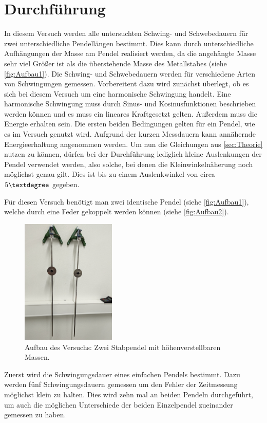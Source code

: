 \section{Durchführung}
\label{sec:Durchführung}
In diesem Versuch werden alle untersuchten Schwing- und Schwebedauern für zwei unterschiedliche Pendellängen bestimmt. Dies kann durch unterschiedliche Aufhängungen der Masse am 
Pendel realisiert werden, da die angehängte Masse sehr viel Größer ist als die überstehende Masse des Metallstabes (siehe \autoref{fig:Aufbau1}).
Die Schwing- und Schwebedauern werden für verschiedene Arten von Schwingungen gemessen. Vorbereitent dazu wird zunächst überlegt, ob es sich bei diesem Versuch um eine 
harmonische Schwingung handelt. Eine harmonische Schwingung muss durch  Sinus- und Kosinusfunktionen beschrieben werden können und es muss ein lineares Kraftgesetzt gelten.
Außerdem muss die Energie erhalten sein. Die ersten beiden Bedingungen gelten für ein Pendel, wie es im Versuch genutzt wird. Aufgrund der kurzen Messdauern kann annähernde 
Energieerhaltung angenommen werden. Um nun die Gleichungen aus \autoref{sec:Theorie} nutzen zu können, dürfen bei der Durchführung lediglich kleine Auslenkungen der Pendel 
verwendet werden, also solche, bei denen die Kleinwinkelnäherung noch möglichst genau gilt. Dies ist bis zu einem Auslenkwinkel von circa $5\textdegree$ gegeben. 


Für diesen Versuch benötigt man zwei identische Pendel (siehe \autoref{fig:Aufbau1}), welche durch eine Feder gekoppelt werden können (siehe \autoref{fig:Aufbau2}).
\begin{figure}
    \centering
    \includegraphics[width=0.4\textwidth]{content/Einzelpendel.jpg}
	\caption{Aufbau des Versuchs: Zwei Stabpendel mit höhenverstellbaren Massen.}
	\label{fig:Aufbau1}
\end{figure}
Zuerst wird die Schwingungsdauer eines einfachen Pendels bestimmt. Dazu werden fünf Schwingungsdauern gemessen um den Fehler der Zeitmessung möglichst klein zu halten.
Dies wird zehn mal an beiden Pendeln durchgeführt, um auch die möglichen Unterschiede der beiden Einzelpendel zueinander gemessen zu haben. 


